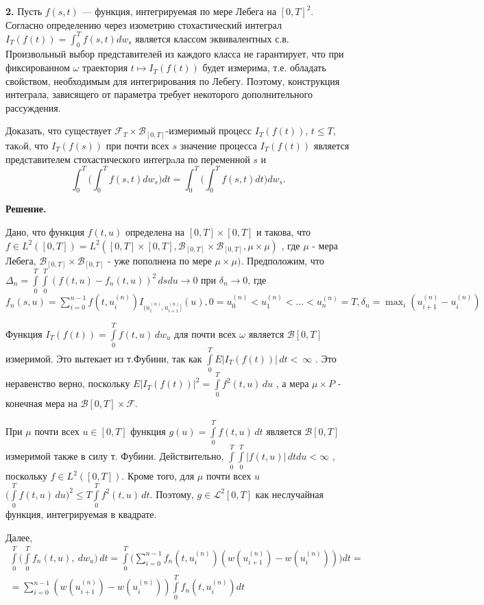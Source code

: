 \documentclass[12pt]{article}
\newcommand\cF{{\mathcal F}}
\newcommand\cL{{\mathcal L}}
\newcommand\cB{{\mathcal B}}
\begin{document}
\bigskip
\noindent
{\bf 2.}  Пусть $f(s,t)$ ---  функция, интегрируемая по мере  Лебега на  $[0,T]^2$.
Согласно определению через изометрию  стохастический интеграл $I_T(f(t))=\int_0^Tf(s,t)dw_s$ является классом эквива\-лентных с.в. Произвольный выбор представителей из каждого класса не гарантирует, что при фиксированном $\omega$ траектория  $t\mapsto I_T(f(t))$ будет измерима, т.е. обладать свойством, необходимым для интегрирования по  Лебегу. Поэтому, конструкция интеграла, зависящего от параметра требует некоторого дополнительного рассуждения.  
 
Доказать, что  
существует $\cF_T\times \cB_{[0,T]}$-измеримый процесс  $I_T(f(t))$, $t\le T$, такoй, что $I_T(f(s))$ 
при почти всех $s$ значение процесса $I_T(f(t))$ является представителем стохастического интегрaла по переменной $s$ и
$$
\int_0^T \Big(\int_0^T f(s,t)dw_s \Big) dt =\int_0^T \Big(\int_0^T f(s,t)dt\Big)dw_s. 
$$

\smallskip
{\bf  Решение.} 

Дано, что функция $f(t,u)$ определена на $[0,T] \times [0,T]$ и такова, что $f \in L^2([0,T])=L^2([0,T] \times [0,T] ,  \cB_{[0,T] } \times  \cB_{[0,T]} , \mu \times \mu)$ , где $\mu$ - мера Лебега, $\cB_{[0,T]} \times \cB_{[0,T]} $ - уже пополнена по мере $\mu \times \mu)$.
Предположим, что $\Delta_n = \int\limits_0^T \int\limits_0^T ( f(t,u) - f_n(t,u))^2 \, ds du \to 0 $ при $\delta_n \to 0$, где $f_n(s,u)= \sum \limits_{i=0}^{n-1} f(t,u_i^{(n)})I_{(u_i^{(n)},u_{i+1}^{(n)}]}(u), 0=u_0^{(n)}<u_1^{(n)}<...<u_n^{(n)}=T, \delta_n= \max _i (u_{i+1}^{(n)}-u_i^{(n)})$

Функция $I_T(f(t)) =  \int\limits_0^T  f(t,u)\, dw_u $ для почти всех $\omega$ является $\cB{[0,T]}$ измеримой. Это вытекает из т.Фубини, так как $\int\limits_0^T  E |I_T(f(t))| \, dt < \ \infty$ . Это неравенство верно, поскольку $ E |I_T(f(t))|^2 = \int\limits_0^T  f^2(t,u) \, du$ , а мера $\mu \times P $ - конечная мера на $\cB{[0,T]} \times \cF $.

При $\mu$ почти всех $u \in [0,T] $ функция $ g(u)=  \int\limits_0^T f(t,u) \, dt $ является  $\cB{[0,T]}$ измеримой также в силу т. Фубини. Действительно, $ \int\limits_0^T \int\limits_0^T | f(t,u) | \, dt du < \infty$ , поскольку  $f \in L^2([0,T])$. Кроме того, для $\mu$ почти всех $u$
$ \Biggl( \int\limits_0^T f(t,u) \, du\Biggr)^2 \le T \int\limits_0^T f^2(t,u) \, dt $.
Поэтому, $g \in \cL^2{[0,T]} $ как неслучайная функция, интегрируемая в квадрате.

Далее,
\begin{multline}
\int\limits_0^T \Biggl( \int\limits_0^T f_n(t,u) ,\ dw_u \biggr) \, dt =  \int\limits_0^T \Biggl( \sum \limits _{i=0}^{n-1} f_n(t,u_i^{(n)})(w(u_{i+1}^{(n)})-w(u_i^{(n)})) \Biggr) dt = \\
=\sum \limits _{i=0}^{n-1}(w(u_{i+1}^{(n)})-w(u_i^{(n)})) \int\limits_0^T f_n(t,u_i^{(n)}) dt
\end{multline}
\end{document}
